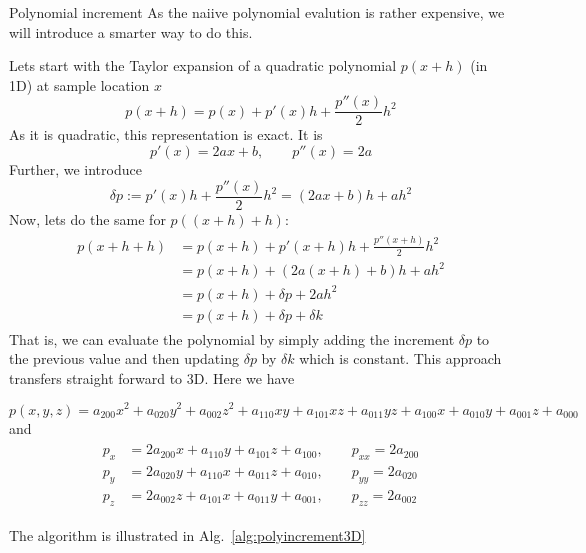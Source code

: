 \documentclass[a4paper,11pt,reqno]{amsart}
\numberwithin{figure}{section}
\numberwithin{table}{section}
\begin{document}
\begin{section}{Polynomial increment }
\label{sec:polynomialIncrement }
%
As the naiive polynomial evalution is rather expensive, we will
introduce a smarter way to do this.

Lets start with the Taylor expansion of a quadratic polynomial $p(x+h)$ (in 1D) 
at sample location $x$
\begin{equation}
p(x+h) = p(x) + p'(x)h + \frac{p''(x)}{2}h^2
\end{equation}
As it is quadratic, this representation is exact.
It is
\begin{equation}
p'(x) = 2ax+b,\qquad p''(x) = 2a
\end{equation}
Further, we introduce 
\begin{equation}
\delta p  := p'(x)h + \frac{p''(x)}{2}h^2 = (2ax+b)h + ah^2
\end{equation}
Now, lets do the same for $p((x+h)+h)$:
\begin{align}
\begin{split}
p(x+h+h) &= p(x+h) + p'(x+h)h + \frac{p''(x+h)}{2}h^2 \\
  &= p(x+h) + (2a(x+h)+b)h + ah^2 \\
  &= p(x+h) + \delta p + 2ah^2 \\
  &= p(x+h) + \delta p +\delta k
\end{split}
\end{align}
That is, we can evaluate the polynomial by simply
adding the increment $\delta p$ to the previous 
value and then updating $\delta p$ by $\delta k$ 
which is constant. This approach transfers straight
forward to 3D. Here we have

\begin{equation}
p(x,y,z) = a_{200}x^2 + a_{020}y^2 + a_{002}z^2 + a_{110}xy + a_{101}xz + a_{011}yz + 
a_{100}x + a_{010}y + a_{001}z + a_{000}
\end{equation}
and
\begin{align}
\begin{split}
p_x    &= 2a_{200}x+a_{110}y + a_{101}z + a_{100},\qquad p_{xx} = 2a_{200}\\
p_y    &= 2a_{020}y+a_{110}x + a_{011}z + a_{010},\qquad p_{yy} = 2a_{020}\\
p_z    &= 2a_{002}z+a_{101}x + a_{011}y + a_{001},\qquad p_{zz} = 2a_{002}
\end{split}
\end{align}

The algorithm is illustrated in Alg.~\ref{alg:polyincrement3D}



\end{section}
\end{document}
